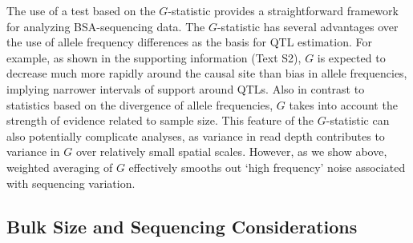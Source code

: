 The use of a test based on the $G$-statistic provides a straightforward
framework for analyzing BSA-sequencing data.  The $G$-statistic has several
advantages over the use of allele frequency differences as the basis for QTL
estimation. For example, as shown in the supporting information (Text S2), $G$
is expected to decrease much more rapidly around the causal site than bias in
allele frequencies, implying narrower intervals of support around QTLs.  Also
in contrast to statistics based on the divergence of allele frequencies, $G$
takes into account the strength of evidence related to sample size. This
feature of the $G$-statistic can also potentially complicate analyses, as
variance in read depth contributes to variance in $G$ over relatively small
spatial scales. However, as we show above, weighted averaging of $G$
effectively smooths out `high frequency' noise associated with sequencing
variation.


\subsection{Bulk Size and Sequencing Considerations}

